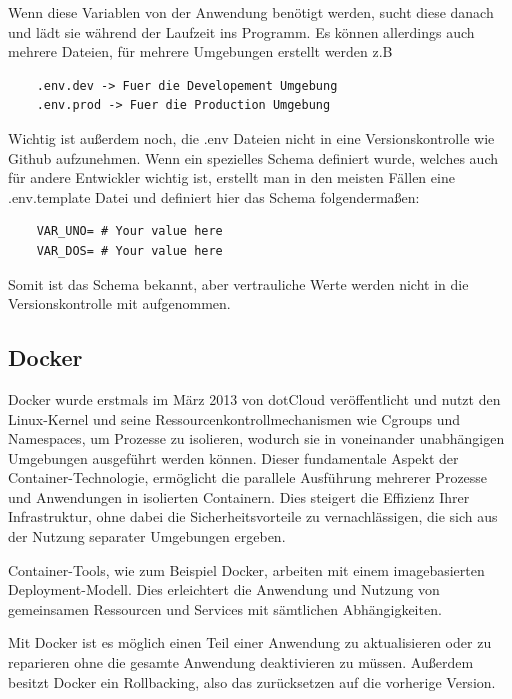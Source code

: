 Wenn diese Variablen von der Anwendung benötigt werden, sucht diese danach und lädt sie während der Laufzeit ins Programm. 
Es können allerdings auch mehrere Dateien, für mehrere Umgebungen erstellt werden z.B
\begin{verbatim}
    .env.dev -> Fuer die Developement Umgebung
    .env.prod -> Fuer die Production Umgebung
\end{verbatim}

Wichtig ist außerdem noch, die .env Dateien nicht in eine Versionskontrolle wie Github aufzunehmen. Wenn ein spezielles Schema definiert wurde, welches auch für andere Entwickler wichtig ist, erstellt man in den meisten Fällen eine .env.template Datei und definiert hier das Schema folgendermaßen:

\begin{verbatim}
    VAR_UNO= # Your value here
    VAR_DOS= # Your value here
\end{verbatim}

Somit ist das Schema bekannt, aber vertrauliche Werte werden nicht in die Versionskontrolle mit aufgenommen.


\cite{Umgebungsvariablen}




\subsection{Docker}

Docker wurde erstmals im März 2013 von dotCloud veröffentlicht und nutzt den Linux-Kernel und seine Ressourcenkontrollmechanismen wie Cgroups und Namespaces, um Prozesse zu isolieren, wodurch sie in voneinander unabhängigen Umgebungen ausgeführt werden können. Dieser fundamentale Aspekt der Container-Technologie, ermöglicht die parallele Ausführung mehrerer Prozesse und Anwendungen in isolierten Containern. Dies steigert die Effizienz Ihrer Infrastruktur, ohne dabei die Sicherheitsvorteile zu vernachlässigen, die sich aus der Nutzung separater Umgebungen ergeben.

Container-Tools, wie zum Beispiel Docker, arbeiten mit einem imagebasierten Deployment-Modell. Dies erleichtert die Anwendung und Nutzung von gemeinsamen Ressourcen und Services mit sämtlichen Abhängigkeiten.

Mit Docker ist es möglich einen Teil einer Anwendung zu aktualisieren oder zu reparieren ohne die gesamte Anwendung deaktivieren zu müssen. Außerdem besitzt Docker ein Rollbacking, also das zurücksetzen auf die vorherige Version.

